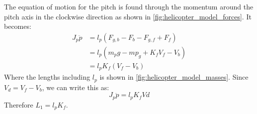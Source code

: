 %
The equation of motion for the pitch is found through the momentum
around the pitch axis in the clockwise direction as shown in
\cref{fig:helicopter_model_forces}. It becomes:
%
\begin{align*}
  J_p\ddot{p} &= l_p(F_{g,b} - F_b - F_{g,f} + F_f) \\
              &= l_p(m_pg - mp_g + K_fV_f - V_b) \\
              &= l_pK_f(V_f-V_b)
\end{align*}
%
Where the lengths including $l_p$ is shown in
\cref{fig:helicopter_model_masses}. Since $V_d = V_f-V_b$, we can
write this as:
%
\begin{equation}
  \label{eq:pitch EoM}
  J_p\ddot{p} = l_pK_fVd
\end{equation}
Therefore $L_1 = l_pK_f$.

